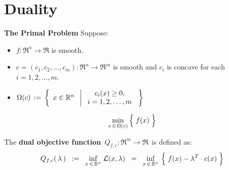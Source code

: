 

\section{Duality}
\setcounter{theorem}{0}
\setcounter{equation}{0}


\renewcommand{\theenumi}{\roman{enumi}}
\renewcommand{\labelenumi}{\textnormal{(\theenumi)}$\;\;$}


\noindent
\textbf{The Primal Problem}
\vskip 0.2cm
\noindent
Suppose:
\begin{itemize}
\item
	$f : \Re^{n} \longrightarrow \Re$ is smooth.
\item
	$c = (c_{1},c_{2},\ldots,c_{m}) : \Re^{n} \longrightarrow \Re^{m}$ is smooth and
	$c_{i}$ is concave for each $i = 1,2,\ldots,m$.
\item
	$\Omega(c) \, := \,
	\left\{\;\,
	x \overset{{\color{white}.}}{\in} \Re^{n}
	\;\;\left\vert\;
		\begin{array}{c}
			c_{i}(x) \geq 0,
			\\
			i = 1,2,\ldots,m
		\end{array}
		\right.
	\;\right\}$
\end{itemize}
\begin{equation*}
\underset{x\,\in\,\Omega(c)}{\min}\left\{\;
	\overset{{\color{white}.}}{f(x)}
	\;\right\}
\end{equation*}

\vskip 0.5cm
\noindent
The \textbf{dual objective function} \,$Q_{f,c} : \Re^{m} \longrightarrow \Re$\, is defined as:
\begin{equation*}
Q_{f,c}(\,\lambda\,)
\;\; := \;\;
	\underset{x\,\in\,\Re^{n}}{\inf}\;\mathcal{L}(x,\lambda)
\;\; = \;\;
	\underset{x\,\in\,\Re^{n}}{\inf}\,\left\{\;f(x) \overset{{\color{white}.}}{-} \lambda^{T}\cdot c(x)\;\right\}
\end{equation*}

